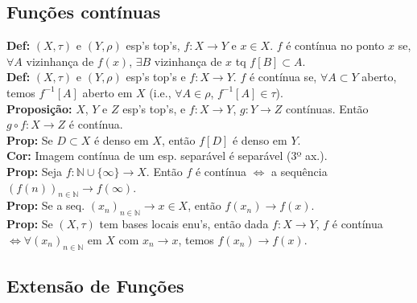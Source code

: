 \documentclass{article}
\begin{document}
\begin{landscape}
\begin{center}
\section{Funções contínuas}
\end{center}
\begin{multicols}{3}
\textbf{Def:} $(X, \tau)$ e $(Y, \rho)$ esp's top's, $f: X \to Y$ e $x \in X$. $f$ é contínua no ponto $x$ se, $\forall A$ vizinhança de $f(x)$, $\exists B$ vizinhança de $x$ tq $f[B] \subset A$.\\
\textbf{Def:} $(X, \tau)$ e $(Y, \rho)$ esp's top's e $f: X \to Y$. $f$ é contínua se, $\forall A \subset Y$ aberto, temos $f^{-1}[A]$ aberto em $X$ (i.e., $\forall A \in \rho$, $f^{-1}[A] \in \tau$).\\
\textbf{Proposição:} $X$, $Y$ e $Z$ esp's top's, e $f: X \to Y$, $g: Y \to Z$ contínuas. Então $g \circ f: X \to Z$ é contínua.\\
\textbf{Prop:} Se $D \subset X$ é denso em $X$, então $f[D]$ é denso em $Y$.\\
\textbf{Cor:} Imagem contínua de um esp. separável é separável (3º ax.).\\
\textbf{Prop:} Seja $f: \mathbb{N} \cup \{\infty\} \to X$. Então $f$ é contínua $\Leftrightarrow$ a sequência $(f(n))_{n \in \mathbb{N}} \to f(\infty)$.\\
\textbf{Prop:} Se a seq. $(x_n)_{n \in \mathbb{N}} \to x \in X$, então $f(x_n) \to f(x)$.\\
\textbf{Prop:} Se $(X, \tau)$ tem bases locais enu's, então dada $f: X \to Y$, $f$ é contínua $\Leftrightarrow \forall (x_n)_{n \in \mathbb{N}}$ em $X$ com $x_n \to x$, temos $f(x_n) \to f(x)$.

\subsection{Extensão de Funções}


\end{multicols}
\end{landscape}
\end{document}
